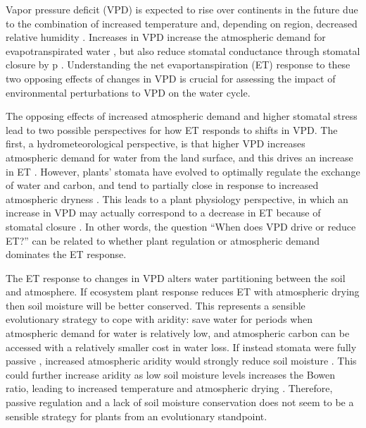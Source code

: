 Vapor pressure deficit (VPD) is expected to rise over continents in
the future due to the combination of increased temperature and,
depending on region, decreased relative humidity
\citep{Byrne_2013}. Increases in VPD increase the atmospheric demand
for evapotranspirated water \citep{Penman_1948, Monteith_1965}, but
also reduce stomatal conductance through stomatal closure \citep{Leuning_1990, MEDLYN_2011} by
p \citep{Rawson1977, Mott2007,
Darmour2010}. Understanding the net evaportanspiration (ET) response
to these two opposing effects of changes in VPD is crucial for
assessing the impact of environmental perturbations to VPD on the
water cycle.

The opposing effects of increased atmospheric demand and higher
stomatal stress lead to two possible perspectives for how ET responds
to shifts in VPD. The first, a hydrometeorological perspective, is
that higher VPD increases atmospheric demand for water from the land
surface, and this drives an increase in ET
\citep{Penman_1948}. However, plants' stomata have evolved to
optimally regulate the exchange of water and carbon, and tend to
partially close in response to increased atmospheric dryness
\citep{Farquhar_1978, Ball_1987, Leuning_1990, Katul_2009, MEDLYN_2011}. This
leads to a plant physiology perspective, in which an increase in VPD
may actually correspond to a decrease in ET because of stomatal
closure \citep[e.g.][]{Rigden_2017}.  In other words, the question
``When does VPD drive or reduce ET?'' can be related to whether plant
regulation or atmospheric demand dominates the ET response.

The ET response to changes in VPD alters water partitioning between
the soil and atmosphere. If ecosystem plant response reduces ET with
atmospheric drying then soil moisture will be better conserved. This
represents a sensible evolutionary strategy to cope with aridity: save
water for periods when atmospheric demand for water is relatively low,
and atmospheric carbon can be accessed with a relatively smaller cost
in water loss. If instead stomata were fully passive \citep [similar
to soil pores, e.g. ][]{Or_2013}, increased atmospheric aridity would
strongly reduce soil moisture \citep{Berg_2017}. This could further
increase aridity as low soil moisture levels increases the Bowen
ratio, leading to increased temperature and atmospheric drying
\citep[][]{Bouchet_1963, Morton_1965, Brutsaert_1999, Ozdogan_2006,
Salvucci_2013, Gentine_2016, Berg_2016, Zhou_2019}. Therefore, passive
regulation and a lack of soil moisture conservation does not seem to
be a sensible strategy for plants from an evolutionary standpoint.

